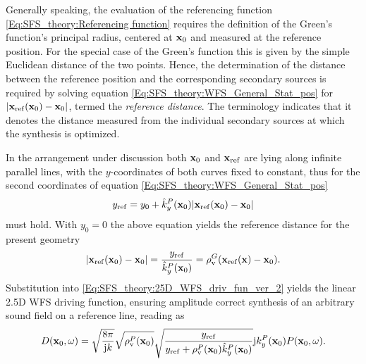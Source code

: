 Generally speaking, the evaluation of the referencing function \eqref{Eq:SFS_theory:Referencing function} requires the definition of the Green's function's principal radius, centered at $\mathbf{x}_0$ and measured at the reference position.
For the special case of the Green's function this is given by the simple Euclidean distance of the two points.
Hence, the determination of the distance between the reference position and the corresponding secondary sources is required by solving equation \eqref{Eq:SFS_theory:WFS_General_Stat_pos} for $|\mathbf{x}_{\mathrm{ref}}(\mathbf{x}_0)-\mathbf{x}_0|$, termed the \emph{reference distance}.
The terminology indicates that it denotes the distance measured from the individual secondary sources at which the synthesis is optimized.

In the arrangement under discussion both $\mathbf{x}_0$ and $\mathbf{x}_{\mathrm{ref}}$ are lying along infinite parallel lines, with the $y$-coordinates of both curves fixed to constant, thus for the second coordinates of equation \eqref{Eq:SFS_theory:WFS_General_Stat_pos}
\begin{equation}
y_{\mathrm{ref}} = y_0 + \hat{k}_y^P(\mathbf{x}_0) |\mathbf{x}_{\mathrm{ref}}(\mathbf{x}_0)-\mathbf{x}_0|
\end{equation}
must hold.
With $y_0=0$ the above equation yields the reference distance for the present geometry
\begin{equation}
|\mathbf{x}_{\mathrm{ref}}(\mathbf{x}_0)-\mathbf{x}_0| = \frac{y_{\mathrm{ref}}}{\hat{k}_y^P(\mathbf{x}_0)} = \rho_\mathrm{v}^G(\mathbf{x}_{\mathrm{ref}}(\mathbf{x})-\mathbf{x}_0). 
\end{equation}
Substitution into \eqref{Eq:SFS_theory:25D_WFS_driv_fun_ver_2} yields the linear 2.5D WFS driving function, ensuring amplitude correct synthesis of an arbitrary sound field on a reference line, reading as
\begin{equation}
D(\mathbf{x}_0, \omega) = 
\sqrt{\frac{8\pi}{\mathrm{j} k}}\sqrt{\rho_\mathrm{v}^P(\mathbf{x}_0)}\sqrt{ \frac{y_{\mathrm{ref}}}{y_{\mathrm{ref}} + \rho_\mathrm{v}^P(\mathbf{x}_0) \hat{k}_y^P(\mathbf{x}_0)}}
\mathrm{j} k_y^P(\mathbf{x}_0) P(\mathbf{x}_0,\omega).
\end{equation}

